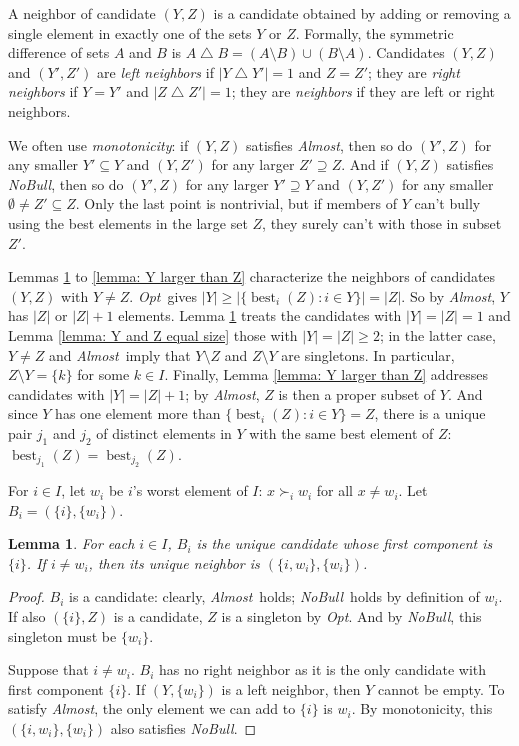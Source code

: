 \documentclass[english, 11pt]{article}
\theoremstyle{plain} %
\newtheorem{lemma}[theorem]{Lemma}
\theoremstyle{definition}
\newcommand{\opt}{\textsl{Opt}}
\newcommand{\nb}{\textsl{NoBull}}
\newcommand{\alm}{\textsl{Almost}}
\DeclareMathOperator{\best}{best}
\begin{document}
A neighbor of candidate $(Y,Z)$ is a candidate obtained by adding or removing a single element in exactly one of the sets $Y$ or $Z$. Formally, the symmetric difference of sets $A$ and $B$ is $A \bigtriangleup B = (A \setminus B) \cup (B \setminus A)$. Candidates $(Y,Z)$ and $(Y',Z')$ are \emph{left neighbors\/} if $|Y \bigtriangleup Y'| = 1$ and $Z = Z'$; they are \emph{right neighbors\/} if $Y = Y'$ and $|Z \bigtriangleup Z'| = 1$; they are \emph{neighbors\/} if they are left or right neighbors.

We often use \emph{monotonicity\/}: if $(Y,Z)$ satisfies \alm, then so do $(Y', Z)$ for any smaller $Y' \subseteq Y$ and $(Y,Z')$ for any larger $Z' \supseteq Z$. And if $(Y,Z)$ satisfies \nb, then so do $(Y',Z)$ for any larger $Y' \supseteq Y$ and $(Y,Z')$ for any smaller $\emptyset \neq Z' \subseteq Z$. Only the last point is nontrivial, but if members of $Y$ can't bully using the best elements in the large set $Z$, they surely can't with those in subset $Z'$.

Lemmas \ref{lemma: singleton contender} to \ref{lemma: Y larger than Z} characterize the neighbors of candidates $(Y,Z)$ with $Y \neq Z$. \opt\ gives $|Y| \geq |\{\best_i(Z): i \in Y\}| = |Z|$. So by \alm, $Y$ has $|Z|$ or $|Z|+1$ elements. Lemma \ref{lemma: singleton contender} treats the candidates with $|Y| = |Z| = 1$ and Lemma \ref{lemma: Y and Z equal size} those with $|Y| = |Z| \geq 2$; in the latter case, $Y \neq Z$ and \alm\ imply that $Y \setminus Z$ and $Z \setminus Y$ are singletons. In particular, $Z \setminus Y = \{k\}$ for some $k \in I$. Finally, Lemma \ref{lemma: Y larger than Z} addresses candidates with $|Y| = |Z|+1$; by \alm, $Z$ is then a proper subset of $Y$. And since $Y$ has one element more than $\{\best_i(Z): i \in Y\} = Z$, there is a unique pair $j_1$ and $j_2$ of distinct elements in $Y$ with the same best element of $Z$: $\best_{j_1}(Z) = \best_{j_2}(Z)$.

For $i \in I$, let $w_i$ be $i$'s worst element of $I$: $x \succ_i w_i$ for all $x \neq w_i$. Let $B_i = (\{i\}, \{w_i\})$.

\begin{lemma}\label{lemma: singleton contender}
For each $i \in I$, $B_i$ is the unique candidate whose first component is $\{i\}$.  If $i \neq w_i$, then its unique neighbor is $(\{i,w_i\},\{w_i\})$.
\end{lemma}

\begin{proof}
$B_i$ is a candidate: clearly, \alm\ holds; \nb\ holds by definition of $w_i$. If also $(\{i\},Z)$ is a candidate, $Z$ is a singleton by \opt. And by \nb, this singleton must be $\{w_i\}$.

Suppose that $i \neq w_i$. $B_i$ has no right neighbor as it is the only candidate with first component $\{i\}$. If $(Y, \{w_i\})$ is a left neighbor, then $Y$ cannot be empty. To satisfy \alm, the only element we can add to $\{i\}$ is $w_i$. By monotonicity, this $(\{i,w_i\}, \{w_i\})$ also satisfies \nb.
\end{proof}
\end{document}
